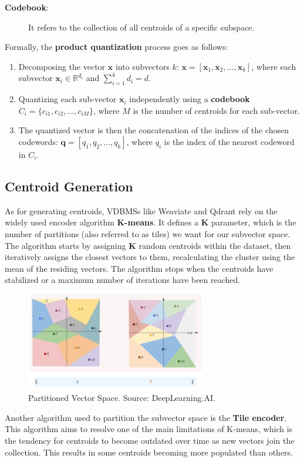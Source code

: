 \begin{description}
\item[\textbf{Codebook}:] It refers to the collection of all centroids of a specific subspace.
\end{description}

Formally, the \textbf{product quantization} process goes as follows:
\begin{enumerate}
    \item Decomposing the vector \( \mathbf{x} \) into subvectors \( k \): \( \mathbf{x} = [\mathbf{x}_1, \mathbf{x}_2, \dots, \mathbf{x}_k] \), where each subvector \( \mathbf{x}_i \in \mathbb{R}^{d_i} \) and \( \sum_{i=1}^k d_i = d \).
    \item Quantizing each sub-vector \( \mathbf{x}_i \) independently using a \textbf{codebook} \( C_i = \{c_{i1}, c_{i2}, \dots, c_{iM}\} \), where \( M \) is the number of centroids for each sub-vector.
    \item The quantized vector is then the concatenation of the indices of the chosen codewords: \( \mathbf{q} = [q_1, q_2, \dots, q_k] \), where \( q_i \) is the index of the nearest codeword in \( C_i \).
\end{enumerate}


\subsection{Centroid Generation}
As for generating centroids, VDBMSs like Weaviate and Qdrant rely on the widely used encoder algorithm \textbf{K-means}. It defines a \textbf{K} parameter, which is the number of partitions (also referred to as tiles) we want for our subvector space. The algorithm starts by assigning \textbf{K} random centroids within the dataset, then iteratively assigns the closest vectors to them, recalculating the cluster using the mean of the residing vectors. The algorithm stops when the centroids have stabilized or a maximum number of iterations have been reached.
\begin{figure}[h]
    \centering
\includegraphics[width=0.7\textwidth]{IMAGES/immagine_2025-02-27_123033735.png}
    \caption[Partitioned Vector Space.]{Partitioned Vector Space. Source: DeepLearning.AI.\footnotemark[1]}
    \label{fig:PQ}
\end{figure}
Another algorithm used to partition the subvector space is the \textbf{Tile encoder}. This algorithm aims to resolve one of the main limitations of K-means, which is the tendency for centroids to become outdated over time as new vectors join the collection. This results in some centroids becoming more populated than others. 

